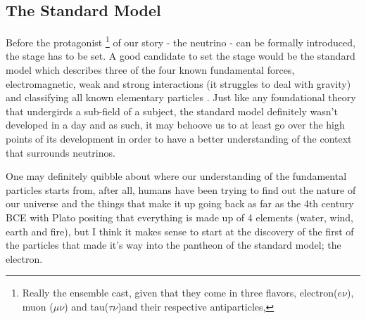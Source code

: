 \subsection{The Standard Model}

Before the protagonist
\footnote{Really the ensemble cast, given that they come in three flavors, electron($e\nu$), muon ($\mu \nu$) and tau($\tau \nu$)and their respective antiparticles,}
of our story - the neutrino - can be formally introduced, the stage has to be set.
A good candidate to set the stage would be the standard model which describes three of the four known fundamental forces, electromagnetic, weak and strong interactions (it struggles to deal with  gravity) and classifying all known elementary particles \cite{Oerter}.
Just like any foundational theory that undergirds a sub-field of a subject, the standard model definitely wasn't developed in a day and as such, it may behoove us to at least go over the high points of its development in order to have a better understanding of the context that surrounds neutrinos.

One may definitely quibble about where our understanding of the fundamental particles starts from, after all, humans have been trying to find out the nature of our universe and the things that make it up going back as far as the 4th century BCE with Plato positing that everything is made up of 4 elements (water, wind, earth and fire)\cite{Timaeus}, but I think it makes sense to start at the discovery of the first of the particles that made it's way into the pantheon of the standard model; the electron.
